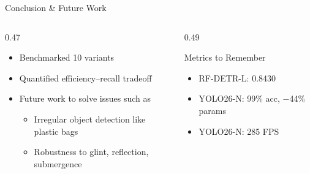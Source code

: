 \begin{frame}{Conclusion \& Future Work}
	\begin{columns}[T]
		\begin{column}{0.47\textwidth}
			\begin{itemize}
				\item Benchmarked 10 variants
				\item Quantified efficiency--recall tradeoff
				\item Future work to solve issues such as
				      \begin{itemize}
					      \item Irregular object detection like plastic bags
					      \item Robustness to glint, reflection, submergence
				      \end{itemize}
			\end{itemize}
		\end{column}
		\begin{column}{0.49\textwidth}
			\begin{block}{Metrics to Remember}
				\begin{itemize}
					\item RF-DETR-L: 0.8430 \mapf
					\item YOLO26-N: 99\% acc, $-$44\% params
					\item YOLO26-N: 285 FPS
				\end{itemize}
			\end{block}
		\end{column}
	\end{columns}
\end{frame}

